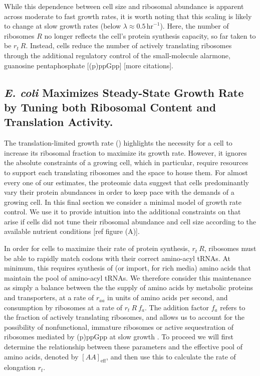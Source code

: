 \newpage

While this dependence between cell size and ribosomal abundance is apparent
across moderate to fast growth rates, it is worth noting that this scaling is
likely to change at slow growth rates (below $\lambda \approx
0.5\,\text{hr}^{-1}$). Here, the number of ribosomes $R$ no longer reflects the
cell's protein synthesis capacity, so far taken to be $r_t
\ R$. Instead, cells reduce the number of actively translating
ribosomes through the additional regulatory control of the small-molecule
alarmone, guanosine pentaphosphate [(p)ppGpp] \citep{dai2016} [more citations].


\subsection{\textit{E. coli} Maximizes Steady-State Growth
Rate by Tuning both Ribosomal Content and Translation Activity.}

The translation-limited growth rate ()
highlights the necessity for a cell to increase its ribosomal fraction to
maximize its growth rate. However, it ignores the absolute constraints of a
growing cell, which in particular, require resources to support each translating
ribosomes and the space to house them. For almost every one of our estimates,
the proteomic data suggest that cells predominantly vary their protein
abundances in order to keep pace with the demands of a growing cell. In this
final section we consider a minimal model of growth rate control. We use it to
provide intuition into the additional constraints on that arise if cells did not
tune their ribosomal abundance and cell size according to the available nutrient
conditions [ref figure (A)].


In order for cells to maximize their rate of protein synthesis, $r_t \ R$,
ribosomes must be able to rapidly match codons with their correct amino-acyl
tRNAs. At minimum, this requires synthesis of (or import, for rich media) amino
acids that maintain the pool of amino-acyl tRNAs. We therefore
consider this maintenance as simply a balance between the the supply of amino
acids by metabolic proteins and transporters, at a rate of $r_{aa}$ in units of
amino acids per second, and consumption by ribosomes at a rate of $r_t \ R
\ f_a$. The addition factor $f_a$ refers to the fraction of actively
translating ribosomes, and allows us to account for the possibility of
nonfunctional, immature ribosomes or active sequestration of ribosomes mediated
by (p)ppGpp at slow growth \citep{dennis2004, dai2016}. To proceed we will first
determine the relationship between these parameters and the
effective pool of amino acids, denoted by
$[AA]_{\text{eff}}$, and then use this to calculate the rate of elongation $r_t$.

